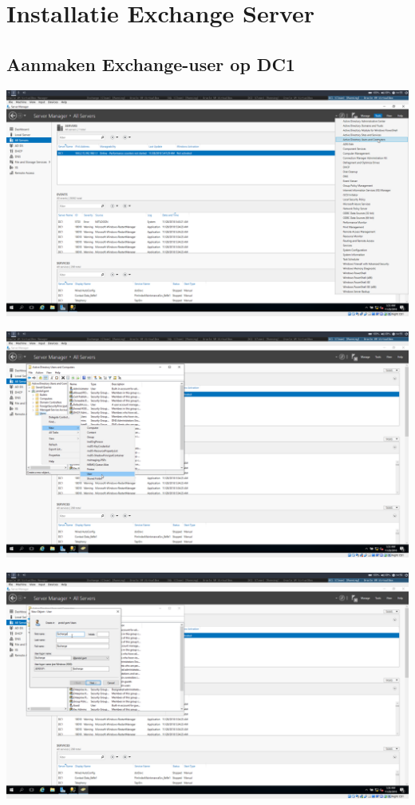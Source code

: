 \documentclass[a4paper]{article}
\begin{document}
\clearpage

\section{Installatie Exchange Server}
\subsection{Aanmaken Exchange-user op DC1}
	\begin{center}
	\includegraphics[width=15cm]{Pictures/Exchange/user/1543413338.png}
\end{center}
	\begin{center}
	\includegraphics[width=15cm]{Pictures/Exchange/user/1543413349.png}
\end{center}
	\begin{center}
	\includegraphics[width=15cm]{Pictures/Exchange/user/1543413368.png}
\end{center}
\end{document}
